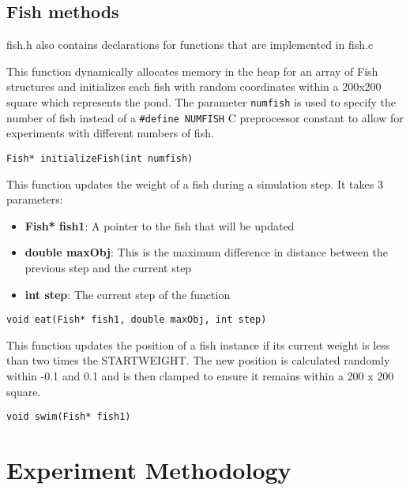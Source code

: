 \documentclass[
]{article}
\providecommand{\tightlist}{%
  \setlength{\itemsep}{0pt}\setlength{\parskip}{0pt}}
\begin{document}
\hypertarget{fish-methods}{%
\subsection{Fish methods}\label{fish-methods}}

fish.h also contains declarations for functions that are implemented in
fish.c

This function dynamically allocates memory in the heap for an array of
Fish structures and initializes each fish with random coordinates within
a 200x200 square which represents the pond. The parameter
\texttt{numfish} is used to specify the number of fish instead of a
\texttt{\#define\ NUMFISH} C preprocessor constant to allow for
experiments with different numbers of fish.

\begin{verbatim}
Fish* initializeFish(int numfish)
\end{verbatim}

This function updates the weight of a fish during a simulation step. It
takes 3 parameters:

\begin{itemize}
\tightlist
\item
  \textbf{Fish* fish1}: A pointer to the fish that will be updated
\item
  \textbf{double maxObj}: This is the maximum difference in distance
  between the previous step and the current step
\item
  \textbf{int step}: The current step of the function
\end{itemize}

\begin{verbatim}
void eat(Fish* fish1, double maxObj, int step)
\end{verbatim}

This function updates the position of a fish instance if its current
weight is less than two times the STARTWEIGHT. The new position is
calculated randomly within -0.1 and 0.1 and is then clamped to ensure it
remains within a 200 x 200 square.

\begin{verbatim}
void swim(Fish* fish1)
\end{verbatim}

\hypertarget{experiment-methodology}{%
\section{Experiment Methodology}\label{experiment-methodology}}
\end{document}

